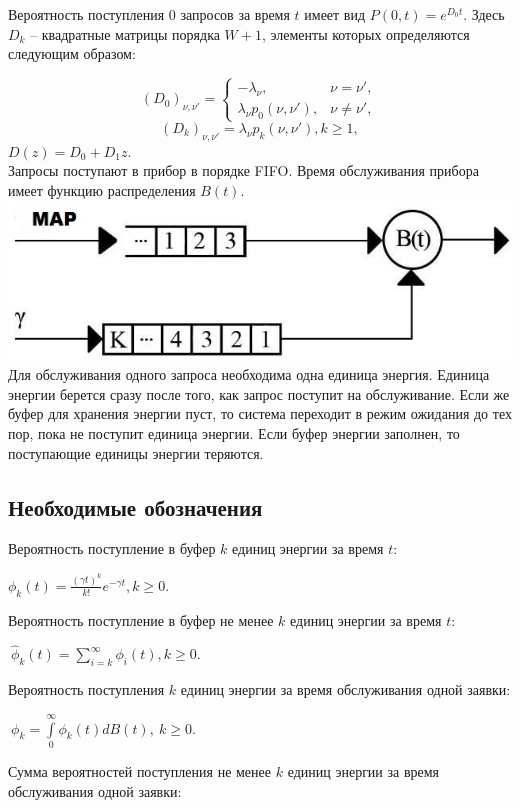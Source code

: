 \documentclass[12pt, a4paper]{article}
\begin{document}
	Вероятность поступления 0 запросов за время $t$ имеет вид $P(0, t) = e^{D_{0}t}$.  Здесь $D_{k}$ – квадратные матрицы порядка $W + 1$, элементы которых определяются следующим образом:

	$$(D_0)_{\nu,\nu'}=\left\{
	\begin{array}{rcl}-\lambda_\nu, &\nu=\nu',\\\lambda_\nu p_0(\nu,\nu'),
	&\nu\neq\nu',
	\end{array}\right.$$
	$$(D_k)_{\nu,\nu'}=\lambda_\nu p_k(\nu,\nu'), k\geq 1,
	$$
	$D(z) = D_{0} + D_{1}z$.\\
	 Запросы поступают 
	в прибор в порядке FIFO. Время обслуживания прибора имеет функцию
	распределения $B(t)$.\\
	\includegraphics{img139}\\
	Для обслуживания одного запроса необходима одна единица энергия. Единица энергии
	берется сразу после того, как запрос поступит на обслуживание.  Если же буфер
	для хранения энергии пуст, то система переходит в режим ожидания
	до тех пор, пока не поступит единица энергии. Если буфер энергии заполнен,
	то поступающие единицы энергии теряются.\newpage
	\subsection {Необходимые обозначения}

Вероятность поступление в буфер $k$ единиц энергии за время $t$:

$\phi_{k}(t) = \frac{(\gamma t)^{k} }{k!} e^{-\gamma t}, k \geq 0$.

Вероятность поступление в буфер не менее $k$ единиц энергии за время $t$:

$\ \hat\phi_{k}(t) = \sum\limits_{i=k}^{\infty} \phi_{i}(t), k \geq 0$.

Вероятность поступления $k$ единиц энергии за время обслуживания одной заявки:

$\ \phi_{k} =   \int\limits_{0}^{\infty}\phi_{k}(t)dB(t),\ k \geq 0$.

Сумма вероятностей поступления не менее $k$ единиц энергии за время обслуживания одной заявки: 
\end{document}
